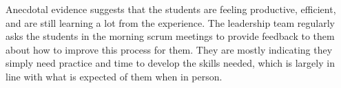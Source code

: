 Anecdotal evidence suggests that the students are feeling productive, efficient, and are still learning a lot from the experience. The leadership team regularly asks the students in the morning scrum meetings to provide feedback to them about how to improve this process for them. They are mostly indicating they simply need practice and time to develop the skills needed, which is largely in line with what is expected of them when in person.
